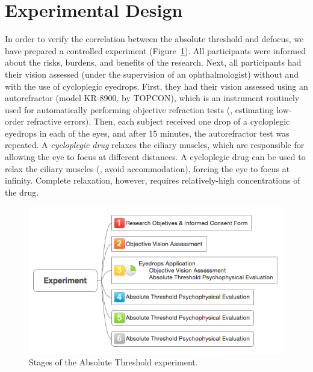 
\section{Experimental Design}
\label{subsec:ExperimentalDesign}

In order to verify the correlation between the absolute threshold and defocus,
we have prepared a controlled experiment (Figure~\ref{fig:experiment}). All participants were informed about the risks, burdens, and benefits of the research. Next, all participants had their vision assessed (under the supervision of an ophthalmologist) without and with the use of cycloplegic eyedrops. First, they had their vision assessed using an autorefractor (model KR-8900, by TOPCON), which is an instrument routinely used for automatically performing objective refraction tests (\ie, estimating low-order refractive errors).  
Then, each subject received one drop of a cycloplegic eyedrops 
in each of the eyes, and after 15 minutes, the autorefractor test was repeated. A {\it cycloplegic drug} relaxes the ciliary muscles, which are responsible for allowing the eye to focus at different distances. A cycloplegic drug can be used to relax the ciliary muscles (\ie, avoid accommodation), forcing the eye to focus at infinity. Complete relaxation, however, requires relatively-high concentrations of the drug.
%
\begin{figure}[htb]
	\centering
	\includegraphics[width=1.0\linewidth]{__Images/04/experiment.png}
	\caption[Stages of the Absolute Threshold experiment]{Stages of the Absolute Threshold experiment.}
	\label{fig:experiment}
\end{figure}

